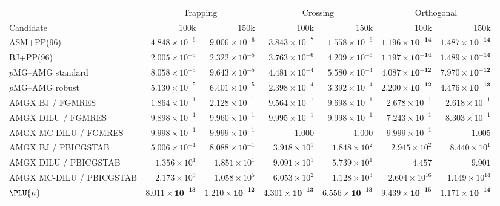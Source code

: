 \begin{table}[htbp]
 \centering
 \scriptsize
 \setlength{\tabcolsep}{3pt}
 \begin{tabular}{@{}lrrrrrr@{}}
  \toprule
  & \multicolumn{2}{c}{Trapping} & \multicolumn{2}{c}{Crossing}
  & \multicolumn{2}{c}{Orthogonal}\\
  Candidate & 100k & 150k & 100k & 150k & 100k & 150k\\
  \midrule
  ASM+PP(96) & $4.848\times10^{-6}$ & $9.006\times10^{-6}$ & $3.843\times10^{-7}$ & $1.558\times10^{-6}$ & $\mathbf{1.196\times10^{-14}}$ & $\mathbf{1.487\times10^{-14}}$\\
  BJ+PP(96) & $2.005\times10^{-5}$ & $2.322\times10^{-5}$ & $3.763\times10^{-6}$ & $4.209\times10^{-6}$ & $\mathbf{1.197\times10^{-14}}$ & $\mathbf{1.489\times10^{-14}}$\\
  $p$MG--AMG standard & $8.058\times10^{-5}$ & $9.643\times10^{-5}$ & $4.481\times10^{-4}$ & $5.580\times10^{-4}$ & $\mathbf{4.087\times10^{-12}}$ & $\mathbf{7.970\times10^{-12}}$\\
  $p$MG--AMG robust & $5.130\times10^{-5}$ & $6.401\times10^{-5}$ & $2.398\times10^{-4}$ & $3.392\times10^{-4}$ & $\mathbf{2.200\times10^{-12}}$ & $\mathbf{4.476\times10^{-13}}$\\
  \midrule
  AMGX BJ / FGMRES & $1.864\times10^{-1}$ & $2.128\times10^{-1}$ & $9.564\times10^{-1}$ & $9.698\times10^{-1}$ & $2.678\times10^{-1}$ & $2.618\times10^{-1}$\\
  AMGX DILU / FGMRES & $9.898\times10^{-1}$ & $9.960\times10^{-1}$ & $9.995\times10^{-1}$ & $9.998\times10^{-1}$ & $7.243\times10^{-1}$ & $8.303\times10^{-1}$\\
  AMGX MC-DILU / FGMRES & $9.998\times10^{-1}$ & $9.999\times10^{-1}$ & $1.000$ & $1.000$ & $9.999\times10^{-1}$ & $1.005$\\
  AMGX BJ / PBICGSTAB & $5.006\times10^{-1}$ & $8.088\times10^{-1}$ & $3.918\times10^{1}$ & $1.848\times10^{2}$ & $2.945\times10^{2}$ & $8.440\times10^{1}$\\
  AMGX DILU / PBICGSTAB & $1.356\times10^{1}$ & $1.851\times10^{1}$ & $9.091\times10^{1}$ & $5.739\times10^{1}$ & $4.457$ & $9.901$\\
  AMGX MC-DILU / PBICGSTAB & $2.173\times10^{3}$ & $1.058\times10^{5}$ & $6.053\times10^{2}$ & $1.128\times10^{3}$ & $2.604\times10^{16}$ & $1.149\times10^{14}$\\
  \midrule
  $\PLU{n}$ & $\mathbf{8.011\times10^{-13}}$ & $\mathbf{1.210\times10^{-12}}$ & $\mathbf{4.301\times10^{-13}}$ & $\mathbf{6.556\times10^{-13}}$ & $\mathbf{9.439\times10^{-15}}$ & $\mathbf{1.171\times10^{-14}}$\\

\end{tabular}
\end{table}
